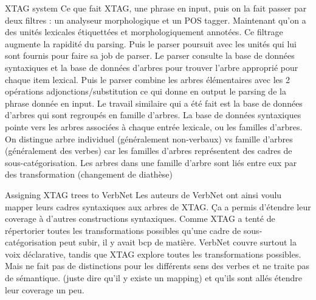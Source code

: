 XTAG system \citep{DoranXTAGSystemWide1994}
Ce que fait XTAG, une phrase en input, puis on la fait passer par deux filtres : un analyseur morphologique et un POS tagger. Maintenant qu'on a des unités lexicales étiquettées et morphologiquement annotées. Ce filtrage augmente la rapidité du parsing. Puis le parser poursuit avec les unités qui lui sont fournis pour faire sa job de parser. Le parser consulte la base de données syntaxiques et la base de données d'arbres pour trouver l'arbre approprié pour chaque item lexical. Puis le parser combine les arbres élémentaires avec les 2 opérations adjonctions/substitution ce qui donne en output le parsing de la phrase donnée en input. Le travail similaire qui a été fait est la base de données d'arbres qui sont regroupés en famille d'arbres. La base de données syntaxiques pointe vers les arbres associées à chaque entrée lexicale, ou les familles d'arbres. On distingue arbre individuel (généralement non-verbaux) vs famille d'arbres (généralement des verbes) car les familles d'arbres représentent des cadres de sous-catégorisation. Les arbres dans une famille d'arbre 
sont liés entre eux par des transformation (changement de diathèse)

Assigning XTAG trees to VerbNet\citep{W04-3326}
Les auteurs de VerbNet ont ainsi voulu mapper leurs cadres syntaxiques aux arbres de XTAG.
Ça a permis d'étendre leur coverage à d'autres constructions syntaxiques. Comme XTAG a tenté de répertorier toutes les transformations possibles qu'une cadre de sous-catégorisation peut subir, il y avait bcp de matière. VerbNet couvre surtout la voix déclarative, tandis que XTAG explore toutes les transformations possibles. Mais ne fait pas de distinctions pour les différents sens des verbes et ne traite pas de sémantique. (juste dire qu'il y existe un mapping) et qu'ils sont allés étendre leur coverage un peu.


